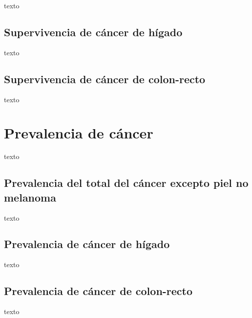 texto

\subsection{Supervivencia de cáncer de hígado}

texto

\subsection{Supervivencia de cáncer de colon-recto}

texto

\section{Prevalencia de cáncer}

texto

\subsection{Prevalencia del total del cáncer excepto piel no melanoma}

texto

\subsection{Prevalencia de cáncer de hígado}

texto

\subsection{Prevalencia de cáncer de colon-recto}

texto






